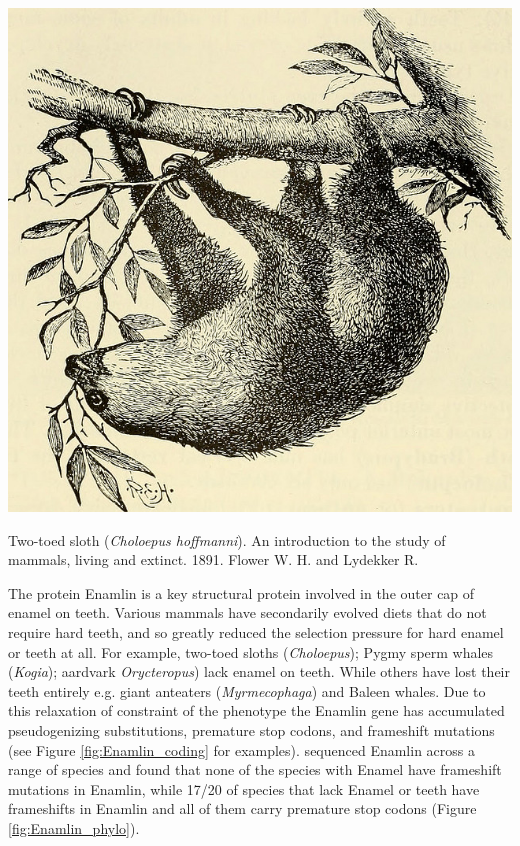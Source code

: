 \begin{marginfigure}
\begin{center}
\includegraphics[width=\textwidth]{illustration_images/Genetic_drift/sloth/20423856040_6e4360df9c_z.jpg}
\end{center}
\caption{Two-toed sloth ({\it Choloepus hoffmanni}). An introduction
  to the study of mammals, living and extinct. 1891. Flower W. H. and Lydekker R.} \label{fig:sloth}  
\end{marginfigure} 

The protein Enamlin is a key structural protein involved in the outer cap of enamel on teeth. Various mammals have secondarily evolved diets that do not require hard teeth, and so greatly reduced the selection pressure for hard enamel  or teeth at all. For example,  two-toed sloths ({\it Choloepus}); Pygmy sperm whales ({\it Kogia}); aardvark {\it Orycteropus}) lack  enamel on teeth. While others have lost their teeth entirely e.g. giant anteaters ({\it Myrmecophaga}) and Baleen whales. Due to this relaxation of constraint of the phenotype the Enamlin gene has accumulated pseudogenizing substitutions, premature stop codons, and frameshift mutations (see Figure \ref{fig:Enamlin_coding}
for examples).  \citeauthor{Meredith:09} sequenced Enamlin across a
range of species and found that none of the species with Enamel have frameshift
mutations in Enamlin, while 17/20 of species that lack Enamel or teeth have
frameshifts in Enamlin and all of them carry premature stop codons
(Figure \ref{fig:Enamlin_phylo}). 

